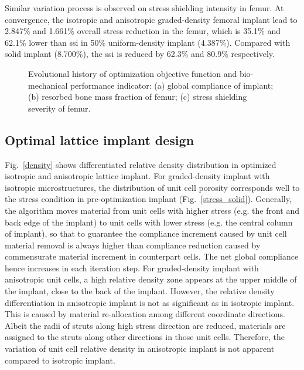 \documentclass[12pt]{extbook}
\begin{document}
Similar variation process is observed on stress shielding intensity in femur. At convergence, the isotropic and anisotropic graded-density femoral implant lead to 2.847\% and 1.661\% overall stress reduction in the femur, which is 35.1\% and 62.1\% lower than ssi in 50\% uniform-density implant (4.387\%). Compared with solid implant (8.700\%), the ssi is reduced by 62.3\% and 80.9\% respectively.\\



\begin{figure}[htbp]
\centering
{}
\caption{Evolutional history of optimization objective function and bio-mechanical performance indicator: (a) global compliance of implant; (b) resorbed bone mass fraction of femur; (c) stress shielding severity of femur.}
\label{history}\end{figure}


\subsection{Optimal lattice implant design}

Fig.~\ref{density} shows differentiated relative density distribution in optimized isotropic and anisotropic lattice implant. For graded-density implant with isotropic microstructures, the distribution of unit cell porosity corresponds well to the stress condition in pre-optimization implant (Fig.~\ref{stress_solid}). Generally, the algorithm moves material from unit cells with higher stress (e.g. the front and back edge of the implant) to unit cells with lower stress (e.g. the central column of implant), so that to guarantee the compliance increment caused by unit cell material removal is always higher than compliance reduction caused by commensurate material increment in counterpart cells. The net global compliance hence increases in each iteration step. For graded-density implant with anisotropic unit cells, a high relative density zone appears at the upper middle of the implant, close to the back of the implant. However, the relative density differentiation in anisotropic implant is not as significant as in isotropic implant. This is caused by material re-allocation among different coordinate directions. Albeit the radii of struts along high stress direction are reduced, materials are assigned to the struts along other directions in those unit cells. Therefore, the variation of unit cell relative density in anisotropic implant is not apparent compared to isotropic implant.\\
\end{document}
